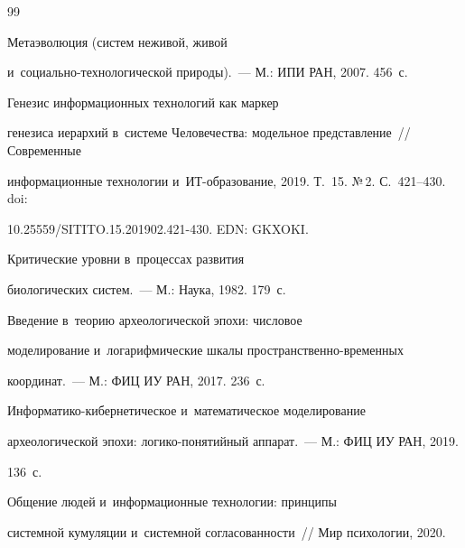 {\small\frenchspacing


{%




\begin{thebibliography}{99}




 Метаэволюция (сис\-тем неживой, живой  


и~со\-ци\-аль\-но-тех\-но\-ло\-ги\-че\-ской природы).~--- М.: ИПИ РАН, 2007. 456~с.




 Генезис информационных технологий как маркер 


генезиса иерархий в~сис\-те\-ме Человечества: модельное представление~/\!\!/ Современные 


информационные технологии и~ИТ-обра\-зо\-ва\-ние, 2019. Т.~15. №\,2. С.~421--430. doi: 


10.25559\!/\!SITITO.15.201902.421-430. EDN: GKXOKI.







 Критические уровни в~процессах развития 


биологических сис\-тем.~--- М.: Наука, 1982. 179~с.




 Введение в~теорию археологической эпохи: чис\-ло\-вое 


моделирование и~логарифмические шкалы про\-стран\-ст\-вен\-но-вре\-мен\-ных 


координат.~--- М.: ФИЦ ИУ РАН, 2017. 236~с.






Ин\-фор\-ма\-ти\-ко-ки\-бер\-не\-ти\-че\-ское и~математическое моделирование 


археологической эпохи: ло\-ги\-ко-по\-ня\-тий\-ный аппарат.~--- М.: ФИЦ ИУ РАН, 2019. 


136~с.




 Общение людей и~информационные технологии: принципы  


сис\-тем\-ной кумуляции и~сис\-тем\-ной со\-гла\-со\-ван\-ности~/\!\!/ Мир психологии, 2020. 



\end{thebibliography}}}
